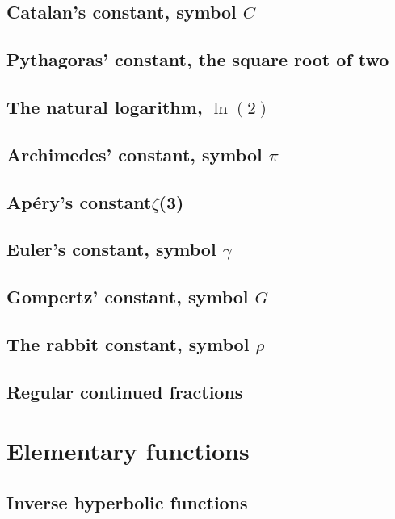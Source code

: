 \documentclass[11pt]{article}
\begin{document}
    \subsection{Catalan's constant, symbol $C$}

    \subsection{Pythagoras' constant, the square root of two}

    \subsection{The natural logarithm, $\ln(2)$}

    \subsection{Archimedes' constant, symbol $\pi$}

    \subsection{Ap\'{e}ry's constant$\zeta$(3)}

    \subsection{Euler's constant, symbol $\gamma$}

    \subsection{Gompertz' constant, symbol $G$}

    \subsection{The rabbit constant, symbol $\rho$}

    \subsection{Regular continued fractions}

  \section{Elementary functions}
    \subsection{Inverse hyperbolic functions}
\end{document}
